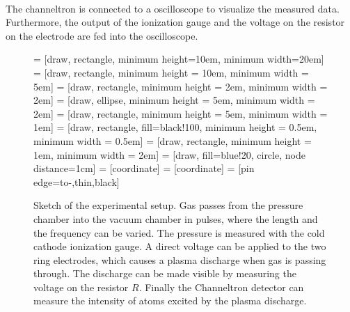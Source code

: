 \documentclass[a4paper,10pt]{article}
\begin{document}
\\
The channeltron is connected to a oscilloscope to visualize the measured data. Furthermore, the output of the ionization gauge and the voltage on the resistor on the electrode are fed into the oscilloscope.
\begin{figure}[H]
    \centering
     = [draw, rectangle,
    minimum height=10em, minimum width=20em]
     = [draw, rectangle, minimum height = 10em, minimum width = 5em]
     = [draw, rectangle, minimum height = 2em, minimum width = 2em]
     = [draw, ellipse, minimum height = 5em, minimum width = 2em]
     = [draw, rectangle, minimum height = 5em, minimum width = 1em]
     = [draw, rectangle, fill=black!100, minimum height = 0.5em, minimum width = 0.5em]
     = [draw, rectangle, minimum height = 1em, minimum width = 2em]
     = [draw, fill=blue!20, circle, node distance=1cm]
     = [coordinate]
     = [coordinate]
     = [pin edge={to-,thin,black}]

\caption{Sketch of the experimental setup. Gas passes from the pressure chamber into the vacuum chamber in pulses, where the length and the frequency can be varied. The pressure is measured with the cold cathode ionization gauge. A direct voltage can be applied to the two ring electrodes, which causes a plasma discharge when gas is passing through. The discharge can be made visible by measuring the voltage on the resistor $R$. Finally the Channeltron detector can measure the intensity of atoms excited by the plasma discharge. }
\label{fig_setup}
\end{figure}
\end{document}

